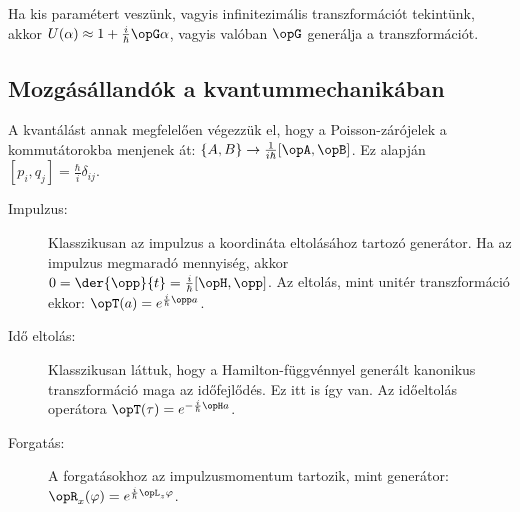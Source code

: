    Ha kis paramétert veszünk, vagyis infinitezimális transzformációt tekintünk, akkor $U(\alpha)\approx 1+\frac{i}{\hbar}\opG\alpha$, vagyis valóban $\opG$ generálja a transzformációt. 
   
  \subsection{Mozgásállandók a kvantummechanikában}
   A kvantálást annak megfelelően végezzük el, hogy a Poisson-zárójelek a kommutátorokba menjenek át: $\{A,B\}\to \frac{1}{i\hbar}[\opA,\opB]$.
   Ez alapján $[p_i,q_j]=\frac{\hbar}{i}\delta_{ij}$.
   \begin{description}
    \item[Impulzus:] Klasszikusan az impulzus a koordináta eltolásához tartozó generátor.
   Ha az impulzus megmaradó mennyiség, akkor $0=\der{\opp}{t}=\frac{i}{\hbar}[\opH,\opp]$.
   Az eltolás, mint unitér transzformáció ekkor: $\opT(a)=e^{\frac{i}{\hbar}\opp a}$.
    \item[Idő eltolás:] Klasszikusan láttuk, hogy a Hamilton-függvénnyel generált kanonikus transzformáció maga az időfejlődés.
   Ez itt is így van.
   Az időeltolás operátora $\opT(\tau)=e^{-\frac{i}{\hbar}\opH a}$.
    \item[Forgatás:] A forgatásokhoz az impulzusmomentum tartozik, mint generátor: $\opR_x(\varphi)=e^{\frac{i}{\hbar}\opL_z \varphi}$.
   \end{description}
